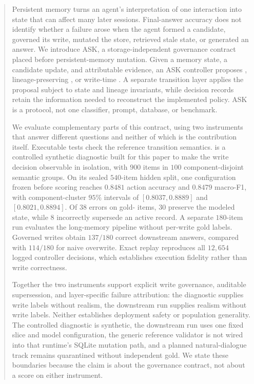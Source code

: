 \begin{abstract}
Persistent memory turns an agent's interpretation of one interaction into state
that can affect many later sessions. Final-answer accuracy does not identify
whether a failure arose when the agent formed a candidate, governed its write,
mutated the store, retrieved stale state, or generated an answer. We introduce
ASK, a storage-independent governance contract placed before persistent-memory
mutation. Given a memory state, a candidate update, and attributable evidence,
an ASK controller proposes \keep, lineage-preserving \supersede, or
write-time \abstain. A separate transition layer applies the proposal subject
to state and lineage invariants, while decision records retain the information
needed to reconstruct the implemented policy. ASK is a protocol, not one
classifier, prompt, database, or benchmark.

We evaluate complementary parts of this contract, using two instruments that
answer different questions and neither of which is the contribution itself.
Executable tests check the
reference transition semantics. \mgpc{} is a controlled synthetic diagnostic
built for this paper to make the write decision observable in isolation, with
$900$ items in $100$ component-disjoint semantic groups. On its sealed
$540$-item hidden split, one configuration frozen before scoring reaches
$0.8481$ action accuracy and $0.8479$ macro-F1, with component-cluster $95\%$
intervals of $[0.8037,0.8889]$ and $[0.8021,0.8894]$. Of $38$ errors on
gold-\abstain{} items, $30$ preserve the modeled state, while $8$ incorrectly
supersede an active record. A separate $180$-item \lme{} run evaluates the
long-memory pipeline without per-write gold labels. Governed writes obtain
$137/180$ correct downstream answers, compared with $114/180$ for naive
overwrite. Exact replay reproduces all $12{,}654$ logged controller decisions,
which establishes execution fidelity rather than write correctness.

Together the two instruments support explicit write governance, auditable
supersession, and layer-specific failure attribution: the diagnostic supplies
write labels without realism, the downstream run supplies realism without write
labels. Neither establishes deployment safety or population generality. The
controlled diagnostic is synthetic, the downstream run uses one fixed slice and
model configuration, the generic reference validator is not wired into that
runtime's SQLite mutation path, and a planned natural-dialogue track remains
quarantined without independent gold. We state these boundaries because the
claim is about the governance contract, not about a score on either instrument.
\end{abstract}
